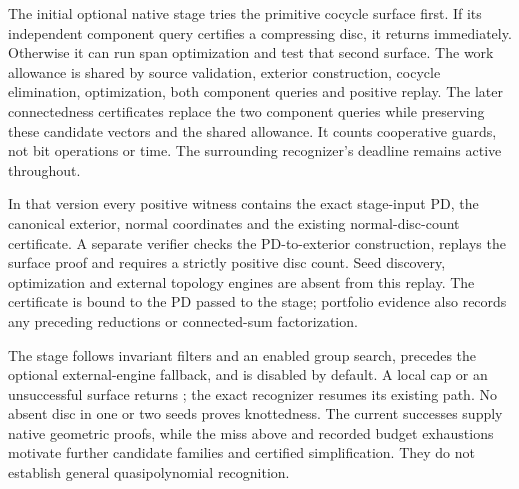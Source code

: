 The initial optional native stage tries the primitive cocycle surface first.
If its independent component query certifies a compressing disc, it returns
immediately. Otherwise it can run span optimization and test that second
surface. The work allowance is shared by source validation, exterior
construction, cocycle elimination, optimization, both component queries and
positive replay. The later connectedness certificates replace the two
component queries while preserving these candidate vectors and the shared
allowance. It counts cooperative guards, not bit operations or time.
The surrounding recognizer's deadline remains active throughout.

In that version every positive witness contains the exact stage-input PD, the canonical
exterior, normal coordinates and the existing normal-disc-count certificate.
A separate verifier checks the PD-to-exterior construction, replays the
surface proof and requires a strictly positive disc count. Seed discovery,
optimization and external topology engines are absent from this replay.
The certificate is bound to the PD passed to the stage; portfolio evidence
also records any preceding reductions or connected-sum factorization.

The stage follows invariant filters and an enabled group search, precedes
the optional external-engine fallback, and is disabled by default. A local
cap or an unsuccessful surface returns ; the exact
recognizer resumes its existing path. No absent disc in one or two seeds
proves knottedness. The current successes supply native geometric proofs,
while the miss above and recorded budget exhaustions motivate further
candidate families and certified simplification. They do not establish
general quasipolynomial recognition.


